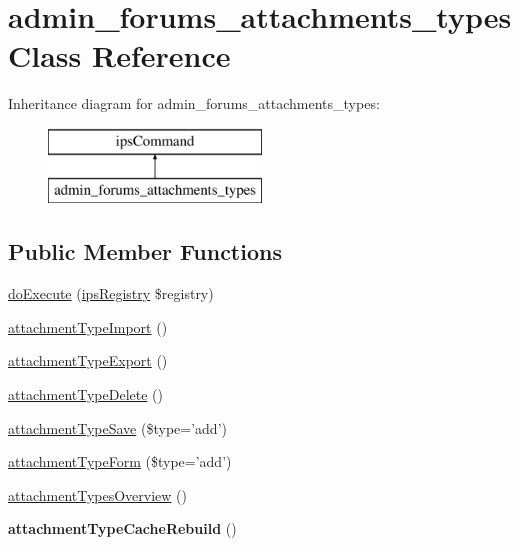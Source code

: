 \hypertarget{classadmin__forums__attachments__types}{\section{admin\-\_\-forums\-\_\-attachments\-\_\-types Class Reference}
\label{classadmin__forums__attachments__types}
}
Inheritance diagram for admin\-\_\-forums\-\_\-attachments\-\_\-types\-:\begin{figure}[H]
\begin{center}
\leavevmode
\includegraphics[height=2.000000cm]{classadmin__forums__attachments__types}
\end{center}
\end{figure}
\subsection*{Public Member Functions}
\begin{DoxyCompactItemize}
\item 
\hyperlink{classadmin__forums__attachments__types_afbc4e912a0604b94d47d66744c64d8ba}{do\-Execute} (\hyperlink{classips_registry}{ips\-Registry} \$registry)
\item 
\hyperlink{classadmin__forums__attachments__types_ab559b766918aad191c0bfcb0152b8f12}{attachment\-Type\-Import} ()
\item 
\hyperlink{classadmin__forums__attachments__types_a166fccc02987dabb7c3705829e8a5a4f}{attachment\-Type\-Export} ()
\item 
\hyperlink{classadmin__forums__attachments__types_a161c55e1f1d25097af6334e6d160da94}{attachment\-Type\-Delete} ()
\item 
\hyperlink{classadmin__forums__attachments__types_a2e15d83826c86d492e1230e5f87c5a1e}{attachment\-Type\-Save} (\$type='add')
\item 
\hyperlink{classadmin__forums__attachments__types_a643c691217e3b668bb1d500fed62bf72}{attachment\-Type\-Form} (\$type='add')
\item 
\hyperlink{classadmin__forums__attachments__types_a4c3a9cb714f0104f07e7a21425020aa3}{attachment\-Types\-Overview} ()
\item 
\hypertarget{classadmin__forums__attachments__types_a75ca1d5d0568b59a058ad5fa6e706a75}{{\bfseries attachment\-Type\-Cache\-Rebuild} ()}\label{classadmin__forums__attachments__types_a75ca1d5d0568b59a058ad5fa6e706a75}

\end{DoxyCompactItemize}
